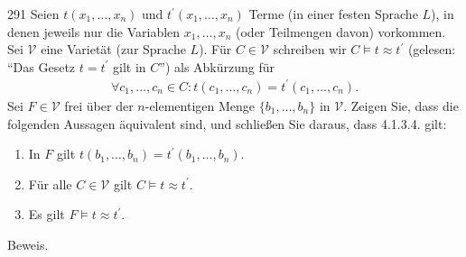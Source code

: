 \begin{algebraUE}{291}
Seien $t(x_1,\dots,x_n)$ und $t^{\prime}(x_1,\dots,x_n)$ Terme (in einer festen
Sprache $L$), in denen jeweils nur die Variablen $x_1,\dots,x_n$ (oder Teilmengen
davon) vorkommen. Sei $\mathcal{V}$ eine Varietät (zur Sprache $L$). Für $C \in \mathcal{V}$
schreiben wir $C \vDash t \approx t^{\prime}$ (gelesen: ``Das Gesetz $t = t^{\prime}$
gilt in $C$'') als Abkürzung für
\begin{align*}
  \forall c_1,\dots,c_n \in C: t(c_1,\dots,c_n) = t^{\prime}(c_1,\dots,c_n).
\end{align*}
Sei $F \in \mathcal{V}$ frei über der $n$-elementigen Menge $\{b_1,\dots,b_n\}$ in $\mathcal{V}$.
Zeigen Sie, dass die folgenden Aussagen äquivalent sind, und schließen Sie daraus, dass 4.1.3.4. gilt:
\begin{enumerate}[label = (\alph*)]
  \item In $F$ gilt $t(b_1,\dots,b_n) = t^{\prime}(b_1,\dots,b_n)$.
  \item Für alle $C \in \mathcal{V}$ gilt $C \vDash t \approx t^{\prime}$.
  \item Es gilt $F \vDash t \approx t^{\prime}$.
\end{enumerate}
\end{algebraUE}
\begin{solution}
Beweis.
\end{solution}
